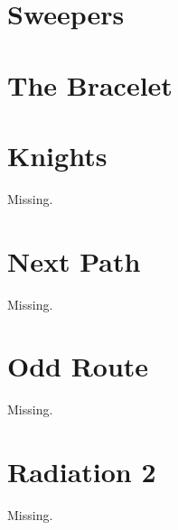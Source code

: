 \documentclass[a4paper, 10pt]{article}
\let\stdsection\section
\renewcommand\section{\newpage\stdsection}
\newcommand{\includecode}[1]{
    }
\newcommand{\algoAuthor}{2} %
\begin{document}
    \section{Sweepers}
        \label{sec:sweepers}
        \includecode{../problems/w12/Sweepers/Sweepers\algoAuthor.cpp}
        
    \section{The Bracelet}
        \label{sec:the_bracelet}
        \includecode{../problems/w12/The_Bracelet/TheBracelet\algoAuthor.cpp}
        
    
    \section{Knights}
        \label{sec:knights}
        Missing.
        
    \section{Next Path}
        \label{sec:next_path}
        Missing.
        
    \section{Odd Route}
        \label{sec:odd_route}
        Missing.
        \includecode{../problems/w13/OddRoute/OddRoute\algoAuthor.cpp}
        
    \section{Radiation 2}
        \label{sec:radiation_2}
        Missing.
    
\end{document}

